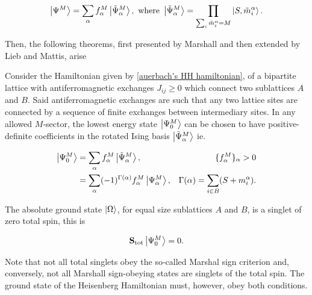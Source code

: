 \documentclass{homework}
\begin{document}
\begin{equation}
    \ket{\Psi^M} = \sum_{\alpha} f_{\alpha}^M \ket{\tilde{\Psi}^M_{\alpha}}, \textnormal{ where } \ket{\tilde{\Psi}^M_{\alpha}} = \prod_{\sum_{i} \tilde{m}_i^\alpha = M} \ket{S, \tilde{m}_i^\alpha}. 
\end{equation}

Then, the following theorems, first presented by Marshall and then extended by Lieb and Mattis, arise


\begin{theo}
    Consider the Hamiltonian given by \cref{auerbach's HH hamiltonian}, of a bipartite lattice with antiferromagnetic exchanges $J_{ij} \geq 0$ which connect two sublattices $A$ and $B$. Said antiferromagnetic exchanges are such that any two lattice sites are connected by a sequence of finite exchanges between intermediary sites. In any allowed $M$-sector, the lowest energy state $\ket{\Psi^M_0}$ can be chosen to have positive-definite coefficients in the rotated Ising basis $\ket{\tilde{\Psi}^M_{\alpha}}$ ie.
    
    \begin{align}
        \ket{\Psi^M_0} &= \sum_{\alpha} f_{\alpha}^M \ket{\tilde{\Psi}^M_{\alpha}}, & \{f_{\alpha}^M\}_{\alpha} > 0 \\
        &= \sum_{\alpha} (-1)^{\Gamma(\alpha)} f_{\alpha}^M \ket{{\Psi}^M_{\alpha}}, & \Gamma(\alpha) = \sum_{i \in B} (S + m_i^\alpha).
    \end{align}
    \label{Marshall_theo_1}
\end{theo}

\begin{theo}
The absolute ground state $\ket{\Omega}$, for equal size sublattices $A$ and $B$, is a singlet of zero total spin, this is 

$$
    {{\bf S}}_{\textnormal{tot}} \ket{\Psi^M_0}= 0.
$$
\label{Marshall_theo_2}
\end{theo}

Note that not all total singlets obey the so-called Marshal sign criterion and, conversely, not all Marshall sign-obeying states are singlets of the total spin. The ground state of the Heisenberg Hamiltonian must, however, obey both conditions. \\
\end{document}
